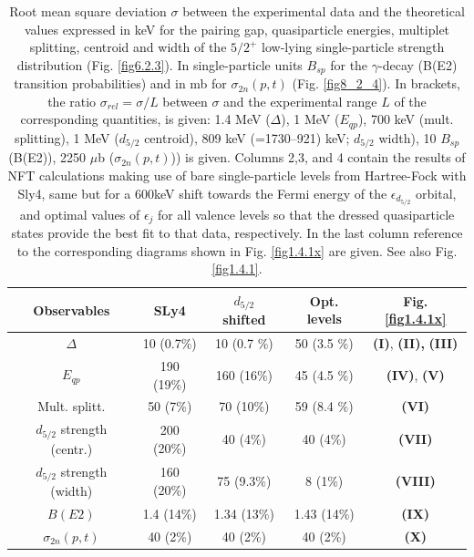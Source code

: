  \begin{table}
\begin{center}
\begin{tabular}{|c|c|c|c|c|}
\hline
  Observables  &  SLy4 &  $d_{5/2}$ shifted  & Opt. levels& Fig. \ref{fig1.4.1x} \\ 
\hline
$\Delta$ &  10  (0.7\%) &  10  (0.7 \%) & 50   (3.5 \%)&\textbf{(I)}, \textbf{(II),} \textbf{(III)}\\
 $E_{qp}$ & 190 (19\%)  & 160  (16\%)   & 45  (4.5 \%)& \textbf{(IV)}, \textbf{(V)}\\
 Mult.  splitt. & 50  (7\%) & 70  (10\%)    & 59  (8.4 \%)& \textbf{(VI)}\\
  $d_{5/2}$ strength (centr.) & 200  (20\%)  & 40  (4\%)   & 40  (4\%)& \textbf{(VII)} \\
$d_{5/2}$ strength (width) & 160  (20\%)  &75  (9.3\%)  &  8  (1\%)& \textbf{(VIII)}\\
$B(E2)$ & 1.4  (14\%) & 1.34  (13\%)   & 1.43  (14\%)& \textbf{(IX)}\\ 
$\sigma_{2n}(p,t)$ & 40 (2\%) & 40 (2\%) & 40 (2\%) &\textbf{(X)}\\
 \hline
\end{tabular}
\caption{ Root  mean square deviation $\sigma$ between  the experimental data and the theoretical values expressed in keV for the pairing gap, quasiparticle energies, multiplet splitting, centroid and width of the  
$5/2^+$ low-lying single-particle strength distribution (Fig. \ref{fig6.2.3}). In single-particle units $B_{sp}$ for the $\gamma$-decay  (B(E2) transition probabilities) and in mb for $\sigma_{2n}(p,t)$ (Fig. \ref{fig8_2_4}). In brackets, 
the ratio $\sigma_{rel}=\sigma/L$ between $\sigma$ and the experimental  range $L$ of the corresponding quantities, is given: 1.4 MeV ($\Delta$), 1 MeV ($E_{qp}$), 700 keV (mult. splitting), 
1 MeV ($d_{5/2}$ centroid),  809 keV (=1730--921) keV;  $d_{5/2}$ width), 10 $B_{sp}$ (B(E2)), 2250 $\mu$b ($\sigma_{2n}(p,t)$)) is given. Columns 2,3, and 4 contain the results of NFT calculations making use of bare single-particle levels from Hartree-Fock with Sly4, same but for a 600keV shift towards the Fermi energy of the $\epsilon_{d_{5/2}}$ orbital, and optimal values of $\epsilon_j$ for all valence levels so that the dressed quasiparticle states provide the best fit to that data, respectively. In the last column reference to the corresponding diagrams shown in Fig. \ref{fig1.4.1x} are given. See also Fig. \ref{fig1.4.1}.}
\label{tab1.4.1}
\end{center}
\end{table}



